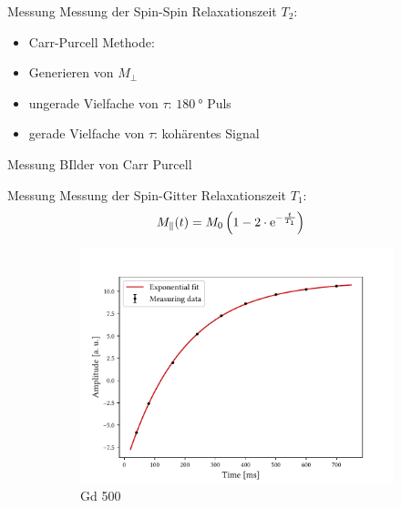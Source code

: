 \begin{frame}{Messung}
Messung der Spin-Spin Relaxationszeit $T_2$:
	\begin{itemize}
	\item Carr-Purcell Methode:
	\item Generieren von $M_\bot$
	\item ungerade Vielfache von $\tau$:  $\SI{180}{\degree}$ Puls
	\item gerade Vielfache von $\tau$:  kohärentes Signal
	\end{itemize}
\end{frame}

\begin{frame}{Messung}
BIlder von Carr Purcell
\end{frame}

\begin{frame}{Messung}
Messung der Spin-Gitter Relaxationszeit $T_1$:
	\begin{align*}
	M_\parallel (t)&=M_0\left(1-2\cdot\mathrm{e}^{-\frac{t}{T_1}}\right)
	\end{align*}
	\begin{figure}
	\centering
		\begin{subfigure}{.49\textwidth}
		\centering
		\includegraphics[scale=.36]{..//figures//f61_abb_1.pdf}
		\caption{Gd 500}
		\end{subfigure}
		\begin{subfigure}{.49\textwidth}
		\centering

\end{subfigure}
\end{figure}
\end{frame}
